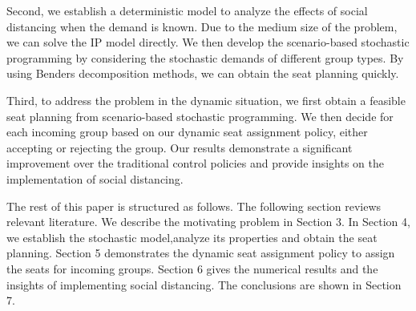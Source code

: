 Second, we establish a deterministic model to analyze the effects of social distancing when the demand is known. Due to the medium size of the problem, we can solve the IP model directly. We then develop the scenario-based stochastic programming by considering the stochastic demands of different group types. By using Benders decomposition methods, we can obtain the seat planning quickly. 

Third, to address the problem in the dynamic situation, we first obtain a feasible seat planning from scenario-based stochastic programming. We then decide for each incoming group based on our dynamic seat assignment policy, either accepting or rejecting the group. Our results demonstrate a significant improvement over the traditional control policies and provide insights on the implementation of social distancing.


The rest of this paper is structured as follows. The following section reviews relevant literature. We describe the motivating problem in Section 3. In Section 4, we establish the stochastic model,analyze its properties and obtain the seat planning. Section 5 demonstrates the dynamic seat assignment policy to assign the seats for incoming groups. Section 6 gives the numerical results and the insights of implementing social distancing. The conclusions are shown in Section 7.
\newpage
